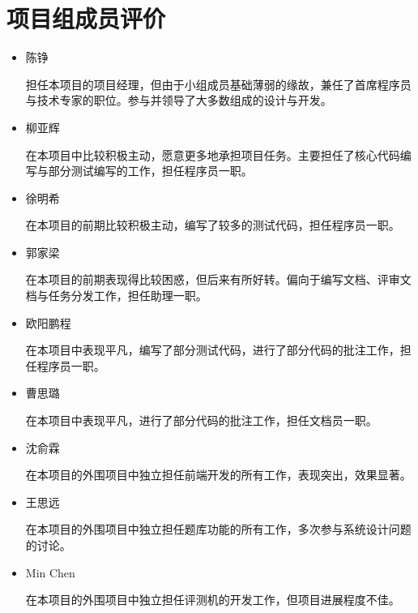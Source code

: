 \chapter{项目组成员评价}

\begin{itemize}
    \item 陈铮
    
    担任本项目的项目经理，但由于小组成员基础薄弱的缘故，兼任了首席程序员与技术专家的职位。参与并领导了大多数组成的设计与开发。
    
    \item 柳亚辉
    
    在本项目中比较积极主动，愿意更多地承担项目任务。主要担任了核心代码编写与部分测试编写的工作，担任程序员一职。
    
    \item 徐明希
    
    在本项目的前期比较积极主动，编写了较多的测试代码，担任程序员一职。
    
    \item 郭家梁
    
    在本项目的前期表现得比较困惑，但后来有所好转。偏向于编写文档、评审文档与任务分发工作，担任助理一职。
    
    \item 欧阳鹏程
    
    在本项目中表现平凡，编写了部分测试代码，进行了部分代码的批注工作，担任程序员一职。
    
    \item 曹思璐
    
    在本项目中表现平凡，进行了部分代码的批注工作，担任文档员一职。
    
    \item 沈俞霖
    
    在本项目的外围项目中独立担任前端开发的所有工作，表现突出，效果显著。
    
    \item 王思远
    
    在本项目的外围项目中独立担任题库功能的所有工作，多次参与系统设计问题的讨论。
    
    \item Min Chen
    
    在本项目的外围项目中独立担任评测机的开发工作，但项目进展程度不佳。
    
\end{itemize}